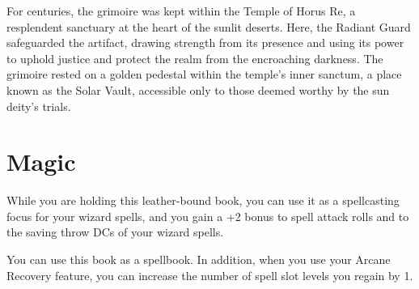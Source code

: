For centuries, the grimoire was kept within the Temple of Horus Re, a resplendent sanctuary at the heart of the sunlit deserts. Here, the Radiant Guard safeguarded the artifact, drawing strength from its presence and using its power to uphold justice and protect the realm from the encroaching darkness. The grimoire rested on a golden pedestal within the temple’s inner sanctum, a place known as the Solar Vault, accessible only to those deemed worthy by the sun deity’s trials.

\section*{Magic}
While you are holding this leather-bound book, you can use it as a spellcasting focus for your wizard spells, and you gain a +2 bonus to spell attack rolls and to the saving throw DCs of your wizard spells.

You can use this book as a spellbook. In addition, when you use your Arcane Recovery feature, you can increase the number of spell slot levels you regain by 1.